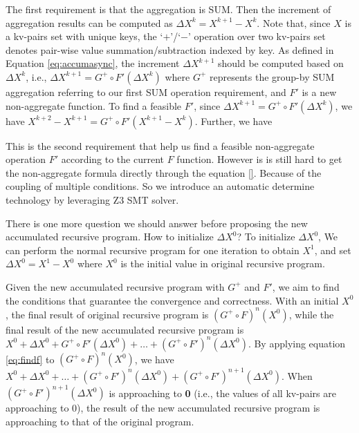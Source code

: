 {\color{green}
The first requirement is that the aggregation is SUM. Then the increment of aggregation results can be computed as $\Delta X^k=X^{k+1}-X^k$. Note that, since $X$ is a kv-pairs set with unique keys, the `$+$'/`$-$' operation over two kv-pairs set denotes pair-wise value summation/subtraction indexed by key. As defined in Equation \ref{eq:accumasync}, the increment $\Delta X^{k+1}$ should be computed based on $\Delta X^k$, i.e., $\Delta X^{k+1}=G^{+}\circ F'(\Delta X^k)$ where $G^{+}$ represents the group-by SUM aggregation referring to our first SUM operation requirement, and $F'$ is a new non-aggregate function. To find a feasible $F'$, since $\Delta X^{k+1}=G^{+}\circ F'(\Delta X^k)$, we have $X^{k+2}-X^{k+1}=G^{+}\circ F'(X^{k+1}-X^k)$. Further, we have
}

This is the second requirement that help us find a feasible non-aggregate operation $F'$ according to the current $F$ function. However is is still hard to get the non-aggregate formula directly through the equation \ref{}. Because of the coupling of multiple conditions. So we introduce an automatic determine technology by leveraging Z3 SMT solver.
{\color{green} There is one more question we should answer before proposing the new accumulated recursive program. How to initialize $\Delta X^0$? To initialize $\Delta X^0$,  We can perform the normal recursive program for one iteration to obtain $X^1$, and set $\Delta X^0=X^1-X^0$ where $X^0$ is the initial value in original recursive program.

Given the new accumulated recursive program with $G^+$ and $F'$, we aim to find the conditions that guarantee the convergence and correctness. With an initial $X^0$, the final result of original recursive program is $(G^{+}\circ F)^n(X^0)$, while the final result of the new accumulated recursive program is $X^0+\Delta X^0+G^+\circ F'(\Delta X^0)+\ldots+(G^+\circ F')^n(\Delta X^0)$. By applying equation \ref{eq:findf} to $(G^{+}\circ F)^n(X^0)$, we have $X^0+\Delta X^0+\ldots+(G^+\circ F')^n(\Delta X^0)+(G^+\circ F')^{n+1}(\Delta X^0)$. When $(G^+\circ F')^{n+1}(\Delta X^0)$ is approaching to \textbf{0} (i.e., the values of all kv-pairs are approaching to 0), the result of the new accumulated recursive program is approaching to that of the original program.
}

